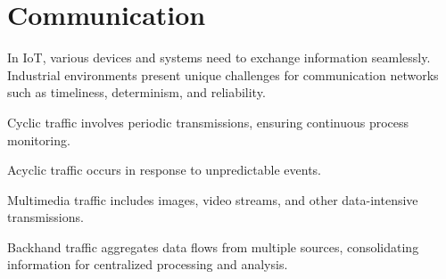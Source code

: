 \section{Communication}

In IoT, various devices and systems need to exchange information seamlessly.
Industrial environments present unique challenges for communication networks such as timeliness, determinism, and reliability.

\begin{definition}
    Cyclic traffic involves periodic transmissions, ensuring continuous process monitoring.
\end{definition}
\begin{definition}
    Acyclic traffic occurs in response to unpredictable events. 
\end{definition}
\begin{definition}
    Multimedia traffic includes images, video streams, and other data-intensive transmissions.
\end{definition}
\begin{definition}
    Backhand traffic aggregates data flows from multiple sources, consolidating information for centralized processing and analysis.
\end{definition}

